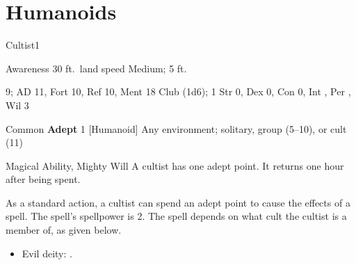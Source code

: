 \section{Humanoids}

    \begin{monsection}{Cultist}{1}
        \begin{spellcontent}
            \begin{spelltargetinginfo}
                \pari {} Awareness 
                \pari {} 30 ft.\ land speed
                \pari {} Medium;  5 ft.
            \end{spelltargetinginfo}
            \begin{spelleffects}
                \pari {} 9;  AD 11, Fort 10, Ref 10, Ment 18
                \pari {} Club  (1d6);  1
                \pari {} Str 0, Dex 0, Con 0, Int , Per , Wil 3
            \end{spelleffects}
        \end{spellcontent}
        \begin{spellfooter}
            \pari {} Common
            \pari {} \textbf{Adept} 1 [Humanoid]
            \pari {} Any environment; solitary, group (5--10), or cult (11\plus)
        \end{spellfooter}
    \end{monsection}
     Magical Ability, Mighty Will
     A cultist has one adept point. It returns one hour after being spent.

     As a standard action, a cultist can spend an adept point to cause the effects of a spell.
    The spell's spellpower is 2.
    The spell depends on what cult the cultist is a member of, as given below.
    \begin{itemize}
        \item Evil deity: .
    \end{itemize}

